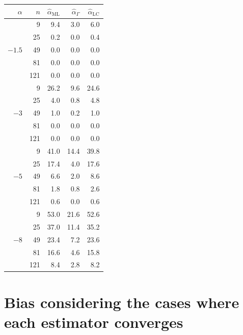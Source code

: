 \documentclass[10pt,a4paper]{article}
\begin{document}
\begin{minipage}{0.5\linewidth}
	\begin{tabular}{rrrrr}
	\toprule
	$\alpha$ & $n$ & $\widehat{\alpha}_{\text{ML}}$ & $\widehat{\alpha}_{\Gamma}$ & $\widehat{\alpha}_{\text{LC}}$\\  
	\midrule
	\multirow{5 }{*}{$-1.5$}
	& 9 & 9.4 & 3.0 & 6.0 \\ 
	& 25 & 0.2 & 0.0 & 0.4 \\ 
	& 49 & 0.0 & 0.0 & 0.0 \\ 
	& 81 & 0.0 & 0.0 & 0.0 \\ 
	& 121 & 0.0 & 0.0 & 0.0 \\  
	\midrule
	\multirow{5 }{*}{$-3$} 
	& 9 & 26.2 & 9.6 & 24.6 \\ 
	& 25 & 4.0 & 0.8 & 4.8 \\ 
	& 49 & 1.0 & 0.2 & 1.0 \\ 
	& 81 & 0.0 & 0.0 & 0.0 \\ 
	& 121 & 0.0 & 0.0 & 0.0 \\	  
	\midrule
	\multirow{5 }{*}{$-5$} 
	& 9 & 41.0 & 14.4 & 39.8 \\ 
	& 25 & 17.4 & 4.0 & 17.6 \\ 
	& 49 & 6.6 & 2.0 & 8.6 \\ 
	& 81 & 1.8 & 0.8 & 2.6 \\ 
	& 121 & 0.6 & 0.0 & 0.6 \\   
	\midrule
	\multirow{5 }{*}{$-8$} 
	& 9 & 53.0 & 21.6 & 52.6 \\ 
	& 25 & 37.0 & 11.4 & 35.2 \\ 
	& 49 & 23.4 & 7.2 & 23.6 \\ 
	& 81 & 16.6 & 4.6 & 15.8 \\ 
	& 121 & 8.4 & 2.8 & 8.2 \\ 
	\bottomrule
\end{tabular}
\end{minipage}

\vspace{1cm}
\section{Bias considering the cases where each estimator converges}

\vspace{1cm}
\end{document}
